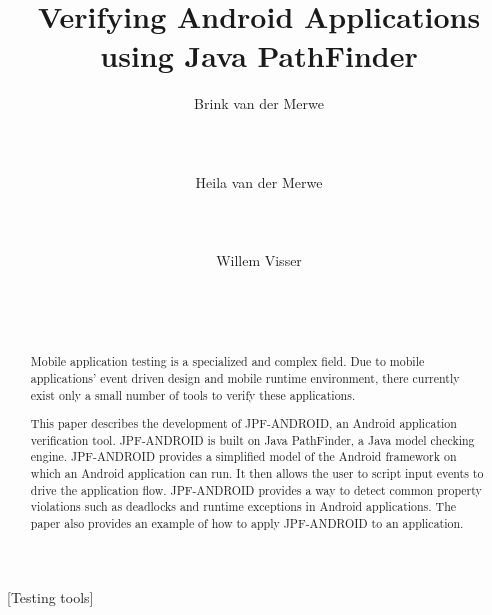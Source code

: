 \documentclass{acm_proc_article-sp}
\begin{document}
\title{Verifying Android Applications using Java PathFinder}


\author{%
\alignauthor  Brink van der Merwe\\
 \\
       \\
       \\
\alignauthor Heila van der Merwe\\
       \\
       \\
       \\
\alignauthor  Willem Visser\\
 \\
       \\
       \\
}

\maketitle

\begin{abstract}
Mobile application testing is a specialized and complex field. Due to mobile applications' event driven design and mobile runtime environment,
there currently exist only a small number of tools to verify these applications.

This paper describes the development of JPF-ANDROID, an Android application verification tool. JPF-ANDROID is built on Java PathFinder, 
a Java model checking engine. JPF-ANDROID provides a simplified model of the Android framework on which an Android application can run. It then allows
the user to script input events to drive the application flow. JPF-ANDROID provides a way to detect common property violations such as deadlocks and runtime exceptions
in Android applications. The paper also provides an example of how to apply JPF-ANDROID to an application.
\end{abstract}

[Testing tools]
\end{document}
